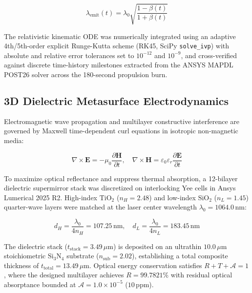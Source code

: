 \documentclass[aps,prd,reprint,superscriptaddress,nofootinbib,floatfix]{revtex4-2}
\begin{document}
\begin{equation}
\lambda_{\mathrm{emit}}(t) = \lambda_0 \sqrt{\frac{1-\beta(t)}{1+\beta(t)}}
\label{eq:bluechirp}
\end{equation}

The relativistic kinematic ODE was numerically integrated using an adaptive 4th/5th-order explicit Runge-Kutta scheme (RK45, SciPy \texttt{solve\_ivp}) with absolute and relative error tolerances set to $10^{-12}$ and $10^{-9}$, and cross-verified against discrete time-history milestones extracted from the ANSYS MAPDL POST26 solver across the 180-second propulsion burn.

\subsection{3D Dielectric Metasurface Electrodynamics}
Electromagnetic wave propagation and multilayer constructive interference are governed by Maxwell time-dependent curl equations in isotropic non-magnetic media:

\begin{equation}
\nabla \times \mathbf{E} = -\mu_0 \frac{\partial \mathbf{H}}{\partial t}, \quad \nabla \times \mathbf{H} = \varepsilon_0 \varepsilon_r \frac{\partial \mathbf{E}}{\partial t}
\label{eq:maxwell}
\end{equation}

To maximize optical reflectance and suppress thermal absorption, a 12-bilayer dielectric supermirror stack was discretized on interlocking Yee cells in Ansys Lumerical 2025 R2. High-index $\mathrm{TiO}_2$ ($n_H=2.48$) and low-index $\mathrm{SiO}_2$ ($n_L=1.45$) quarter-wave layers were matched at the laser center wavelength $\lambda_0=1064.0\,\mathrm{nm}$:

\begin{equation}
d_H = \frac{\lambda_0}{4 n_H} = 107.25\,\mathrm{nm}, \quad d_L = \frac{\lambda_0}{4 n_L} = 183.45\,\mathrm{nm}
\label{eq:layerthickness}
\end{equation}

The dielectric stack ($t_{\mathrm{stack}}=3.49\,\mu\mathrm{m}$) is deposited on an ultrathin $10.0\,\mu\mathrm{m}$ stoichiometric $\mathrm{Si}_3\mathrm{N}_4$ substrate ($n_{\mathrm{sub}}=2.02$), establishing a total composite thickness of $t_{\mathrm{total}}=13.49\,\mu\mathrm{m}$. Optical energy conservation satisfies $R+T+\mathcal{A}=1$, where the designed multilayer achieves $R=99.7821\%$ with residual optical absorptance bounded at $\mathcal{A}=1.0\times 10^{-5}$ ($10\,\mathrm{ppm}$).
\end{document}

